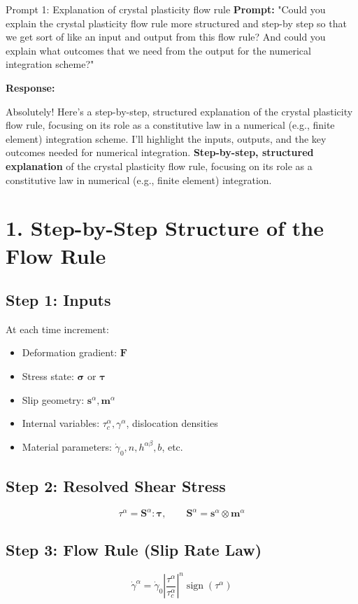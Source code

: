 \documentclass[12pt]{article}
\begin{document}
\begin{summary}{Prompt 1: Explanation of crystal plasticity flow rule}
\textbf{Prompt:} "Could you explain the crystal plasticity flow rule more structured and step-by step so that we get sort of like an input and output from this flow rule? And could you explain what outcomes that we need from the output for the numerical integration scheme?"
\vspace{1em}

\textbf{Response:}

Absolutely! Here’s a step-by-step, structured explanation of the crystal plasticity flow rule, focusing on its role as a constitutive law in a numerical (e.g., finite element) integration scheme. I’ll highlight the inputs, outputs, and the key outcomes needed for numerical integration.
\textbf{Step-by-step, structured explanation} of the crystal plasticity flow rule, focusing on its role as a constitutive law in numerical (e.g., finite element) integration.  

\section*{1. Step-by-Step Structure of the Flow Rule}

\subsection*{Step 1: Inputs}
At each time increment:
\begin{itemize}
    \item Deformation gradient: \( \mathbf{F} \)  
    \item Stress state: \( \boldsymbol{\sigma} \) or \( \boldsymbol{\tau} \)  
    \item Slip geometry: \( \mathbf{s}^\alpha, \mathbf{m}^\alpha \)  
    \item Internal variables: \( \tau_c^\alpha, \gamma^\alpha \), dislocation densities  
    \item Material parameters: \( \dot{\gamma}_0, n, h^{\alpha\beta}, b \), etc.  
\end{itemize}

\subsection*{Step 2: Resolved Shear Stress}
\[
\tau^\alpha = \mathbf{S}^\alpha : \boldsymbol{\tau}, 
\qquad \mathbf{S}^\alpha = \mathbf{s}^\alpha \otimes \mathbf{m}^\alpha
\]

\subsection*{Step 3: Flow Rule (Slip Rate Law)}
\[
\dot{\gamma}^\alpha = \dot{\gamma}_0 \left| \frac{\tau^\alpha}{\tau_c^\alpha} \right|^n \operatorname{sign}(\tau^\alpha)
\]
\end{summary}
\newpage
\end{document}
